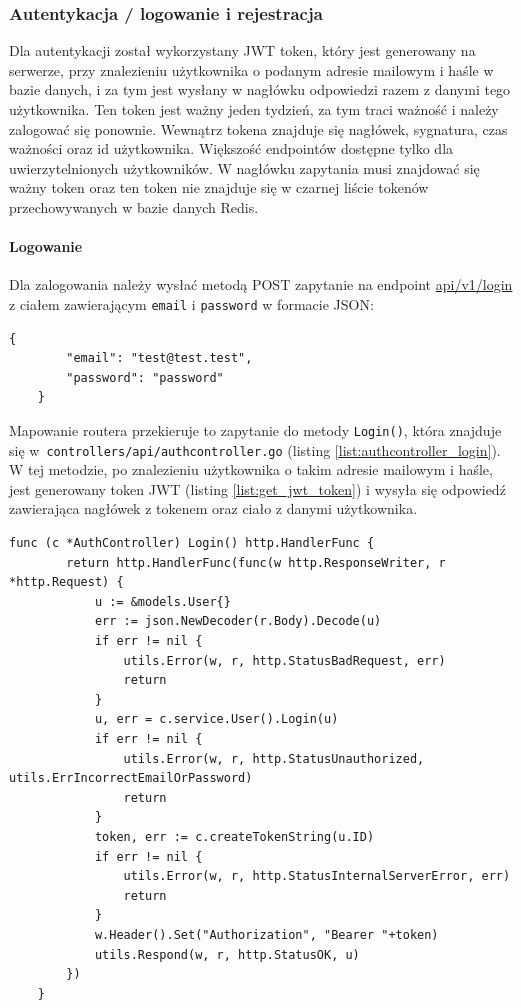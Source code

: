 \subsubsection{Autentykacja / logowanie i rejestracja}
\label{sec:autentykacja}
Dla autentykacji został wykorzystany JWT token, który jest generowany na serwerze, przy znalezieniu użytkownika o podanym adresie mailowym i haśle w bazie danych, i za tym jest wysłany w nagłówku odpowiedzi razem z danymi tego użytkownika.
Ten token jest ważny jeden tydzień, za tym traci ważność i należy zalogować się ponownie. Wewnątrz tokena znajduje się nagłówek, sygnatura, czas ważności oraz id użytkownika.
Większość endpointów dostępne tylko dla uwierzytelnionych użytkowników. W nagłówku zapytania musi znajdować się ważny token oraz ten token nie znajduje się w czarnej liście tokenów przechowywanych w bazie danych Redis.

\paragraph{Logowanie\newline}
Dla zalogowania należy wysłać metodą POST zapytanie na endpoint \url{api/v1/login} z ciałem zawierającym \texttt{email} i \texttt{password} w formacie JSON:
\begin{lstlisting}[basicstyle=\tiny\ttfamily]
    {
        "email": "test@test.test",
        "password": "password"
    }
\end{lstlisting}

Mapowanie routera przekieruje to zapytanie do metody \texttt{Login()}, która znajduje się w~\texttt{controllers/api/authcontroller.go} (listing \ref{list:authcontroller_login}).
W tej metodzie, po znalezieniu użytkownika o takim adresie mailowym i haśle, jest generowany token JWT (listing \ref{list:get_jwt_token}) i wysyła się odpowiedź zawierająca nagłówek z tokenem oraz ciało z danymi użytkownika.
\begin{lstlisting}[label=list:authcontroller_login,caption=Kontroller logowania użytkownika.,basicstyle=\tiny\ttfamily]
    func (c *AuthController) Login() http.HandlerFunc {
        return http.HandlerFunc(func(w http.ResponseWriter, r *http.Request) {
            u := &models.User{}
            err := json.NewDecoder(r.Body).Decode(u)
            if err != nil {
                utils.Error(w, r, http.StatusBadRequest, err)
                return
            }
            u, err = c.service.User().Login(u)
            if err != nil {
                utils.Error(w, r, http.StatusUnauthorized, utils.ErrIncorrectEmailOrPassword)
                return
            }
            token, err := c.createTokenString(u.ID)
            if err != nil {
                utils.Error(w, r, http.StatusInternalServerError, err)
                return
            }
            w.Header().Set("Authorization", "Bearer "+token)
            utils.Respond(w, r, http.StatusOK, u)
        })
    }
\end{lstlisting}

